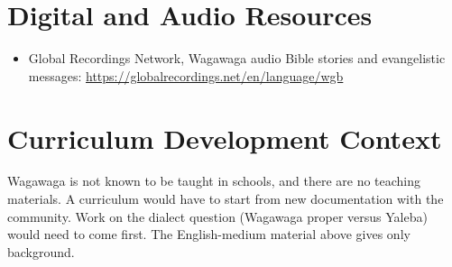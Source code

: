 \documentclass[12pt]{article}
\begin{document}
\section{Digital and Audio Resources}
\begin{itemize}
\item Global Recordings Network, Wagawaga audio Bible stories and evangelistic messages: \url{https://globalrecordings.net/en/language/wgb}
\end{itemize}

\section{Curriculum Development Context}
Wagawaga is not known to be taught in schools, and there are no teaching materials. A curriculum would have to start from new documentation with the community. Work on the dialect question (Wagawaga proper versus Yaleba) would need to come first. The English-medium material above gives only background.
\end{document}
